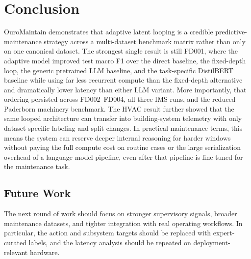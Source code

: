 \section{Conclusion}
OuroMaintain demonstrates that adaptive latent looping is a credible predictive-maintenance strategy across a multi-dataset benchmark matrix rather than only on one canonical dataset. The strongest single result is still FD001, where the adaptive model improved test macro F1 over the direct baseline, the fixed-depth loop, the generic pretrained LLM baseline, and the task-specific DistilBERT baseline while using far less recurrent compute than the fixed-depth alternative and dramatically lower latency than either LLM variant. More importantly, that ordering persisted across FD002--FD004, all three IMS runs, and the reduced Paderborn machinery benchmark. The HVAC result further showed that the same looped architecture can transfer into building-system telemetry with only dataset-specific labeling and split changes. In practical maintenance terms, this means the system can reserve deeper internal reasoning for harder windows without paying the full compute cost on routine cases or the large serialization overhead of a language-model pipeline, even after that pipeline is fine-tuned for the maintenance task.

\subsection{Future Work}
The next round of work should focus on stronger supervisory signals, broader maintenance datasets, and tighter integration with real operating workflows. In particular, the action and subsystem targets should be replaced with expert-curated labels, and the latency analysis should be repeated on deployment-relevant hardware.
